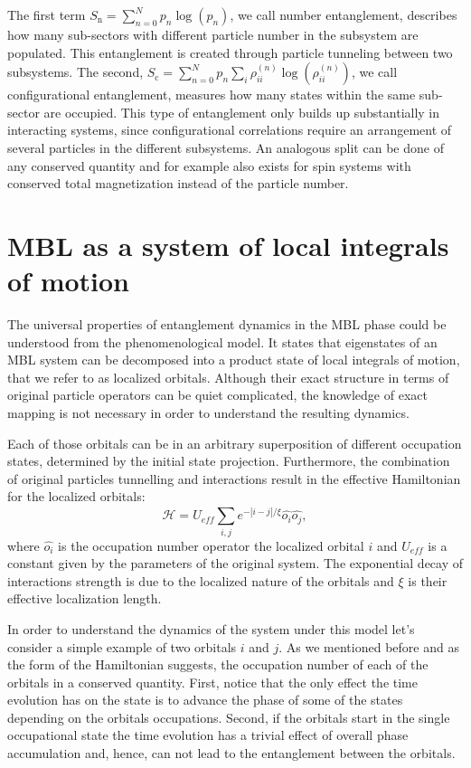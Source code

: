 The first term $S_\text{n} = \sum_{n=0}^N p_n  \log{\left ( p_n \right )}$, we call number entanglement, describes how many sub-sectors with different particle number in the subsystem are populated. This entanglement is created through particle tunneling between two subsystems. The second, $S_\text{c} = \sum_{n=0}^N p_n \sum_{i} \rho_{ii}^{(n)} \log {\left ( \rho_{ii}^{(n)} \right )}$, we call configurational entanglement, measures how many states within the same sub-sector are occupied. This type of entanglement only builds up substantially in interacting systems, since configurational correlations require an arrangement of several particles in the different subsystems. An analogous split can be done of any conserved quantity and for example also exists for spin systems with conserved total magnetization instead of the particle number. 

\section{MBL as a system of local integrals of motion}

The universal properties of entanglement dynamics in the MBL phase could be understood from the phenomenological model\cite{Serbyn2013, Serbyn2013a, Huse2014}. It states that eigenstates of an MBL system can be decomposed into a product state of local integrals of motion, that we refer to as localized orbitals. Although their exact structure in terms of original particle operators can be quiet complicated\cite{Serbyn2013a}, the knowledge of exact mapping is not necessary in order to understand the resulting dynamics. 

Each of those orbitals can be in an arbitrary superposition of different occupation states, determined by the initial state projection. Furthermore, the combination of original particles tunnelling and interactions result in the  effective Hamiltonian for the localized orbitals:
\begin{equation}
\hat{\mathcal{H}} = U_{eff}\sum_{i,j} e^{-\left| i-j\right|/\xi}\hat{o_i}\hat{o_j},
\end{equation}
where $\hat{o_i}$ is the occupation number operator the localized orbital $i$ and $U_{eff}$ is a constant given by the parameters of the original system. The exponential decay of interactions strength is due to the localized nature of the orbitals and $\xi$ is their effective localization length.

In order to understand the dynamics of the system under this model let's consider a simple example of two orbitals $i$ and $j$. As we mentioned before and as the form of the Hamiltonian suggests, the occupation number of each of the orbitals in a conserved quantity. First, notice that the only effect the time evolution has on the state is to advance the phase of some of the states depending on the orbitals occupations. Second, if the orbitals start in the single occupational state the time evolution has a trivial effect of overall phase accumulation and, hence, can not lead to the entanglement between the orbitals.

